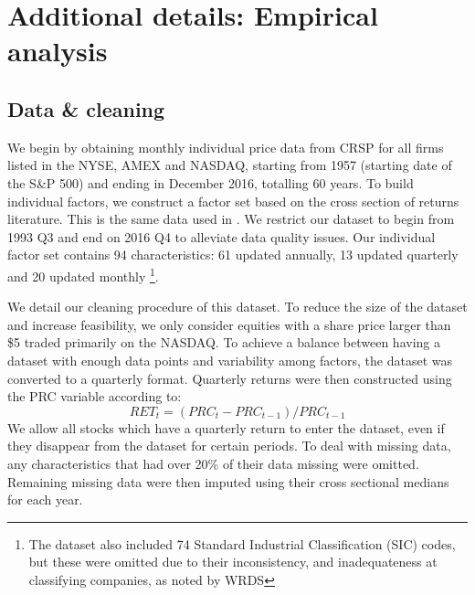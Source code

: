 \documentclass{article}
\begin{document}
\newpage

\section{Additional details: Empirical analysis}

\subsection{Data \& cleaning}\label{app:clean}

We begin by obtaining monthly individual price data from CRSP for all firms listed in the NYSE, AMEX and NASDAQ, starting from 1957 (starting date of the S\&P 500) and ending in December 2016, totalling 60 years. To build individual factors, we construct a factor set based on the cross section of returns literature. This is the same data used in \cite{gu_empirical_2019}. We restrict our dataset to begin from 1993 Q3 and end on 2016 Q4 to alleviate data quality issues. Our individual factor set contains 94 characteristics: 61 updated annually, 13 updated quarterly and 20 updated monthly \footnote{The dataset also included 74 Standard Industrial Classification (SIC) codes, but these were omitted due to their inconsistency, and inadequateness at classifying companies, as noted by WRDS}.



We detail our cleaning procedure of this dataset. To reduce the size of the dataset and increase feasibility, we only consider equities with a share price larger than \$5 traded primarily on the NASDAQ. To achieve a balance between having a dataset with enough data points and variability among factors, the dataset was converted to a quarterly format. Quarterly returns were then constructed using the PRC variable according to:
\begin{equation}
RET_t = (PRC_t - PRC_{t-1})/PRC_{t-1}
\end{equation}
We allow all stocks which have a quarterly return to enter the dataset, even if they disappear from the dataset for certain periods. To deal with missing data, any characteristics that had over 20\% of their data missing were omitted. Remaining missing data were then imputed using their cross sectional medians for each year. 
\end{document}
